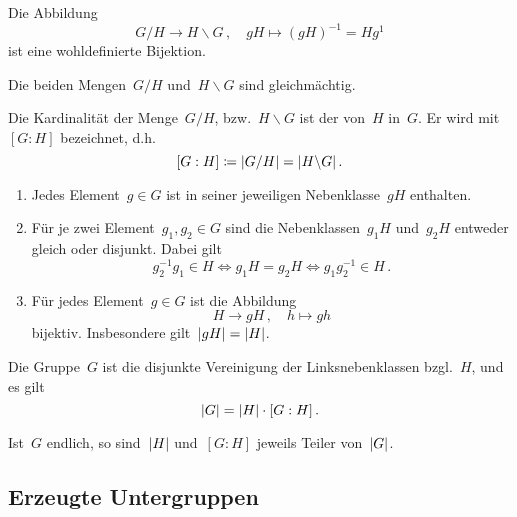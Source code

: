 \begin{proposition}
  Die Abbildung
  \[
    G/H
    \to
    H \backslash G \,,
    \quad
    gH
    \mapsto
    (gH)^{-1}
    =
    Hg^{1}
  \]
  ist eine wohldefinierte Bijektion.
\end{proposition}

\begin{corollary}
  Die beiden Mengen~$G/H$ und~$H \backslash G$ sind gleichmächtig.
\end{corollary}

\begin{definition}
  Die Kardinalität der Menge~$G/H$, bzw.~$H \backslash G$ ist der  von~$H$ in~$G$.
  Er wird mit~$[G : H]$ bezeichnet, d.h.
  \[
    [G : H]
    \coloneqq
    \lvert G/H \rvert
    =
    \lvert H \backslash G \rvert \,.
  \]
\end{definition}

\begin{lemma}
  \leavevmode
  \begin{enumerate}
    \item
      Jedes Element~$g \in G$ ist in seiner jeweiligen Nebenklasse~$gH$ enthalten.
    \item
      Für je zwei Element~$g_1, g_2 \in G$ sind die Nebenklassen~$g_1 H$ und~$g_2 H$ entweder gleich oder disjunkt.
      Dabei gilt
      \[
        g_2^{-1} g_1 \in H
        \iff
        g_1 H = g_2 H
        \iff
        g_1 g_2^{-1} \in H \,.
      \]
    \item
      Für jedes Element~$g \in G$ ist die Abbildung
      \[
        H \to gH \,,
        \quad
        h \mapsto gh
      \]
      bijektiv.
      Insbesondere gilt~$\lvert gH\rvert = \lvert H\rvert$.
  \end{enumerate}
\end{lemma}

\begin{corollary}
  Die Gruppe~$G$ ist die disjunkte Vereinigung der Linksnebenklassen bzgl.~$H$, und es gilt
  \[
    \lvert G\rvert = \lvert H\rvert \cdot [G : H] \,.
  \]
\end{corollary}

\begin{theorem}[Lagrange]
  Ist~$G$ endlich, so sind~$\lvert H\rvert$ und~$[G : H]$ jeweils Teiler von~$\lvert G\rvert$.
\end{theorem}



\subsection{Erzeugte Untergruppen}

